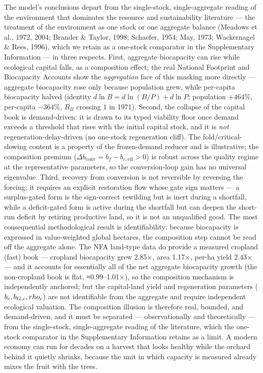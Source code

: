 \documentclass[11pt]{article}
\begin{document}
The model's conclusions depart from the single-stock, single-aggregate reading of the environment that dominates the resource and sustainability literature --- the treatment of the environment as one stock or one aggregate balance (Meadows et al., 1972, 2004; Brander \& Taylor, 1998; Schaefer, 1954; May, 1973; Wackernagel \& Rees, 1996), which we retain as a one-stock comparator in the Supplementary Information --- in three respects. First, aggregate biocapacity can rise while ecological capital falls, as a composition effect; the real National Footprint and Biocapacity Accounts show the \emph{aggregation} face of this masking more directly --- aggregate biocapacity rose only because population grew, while per-capita biocapacity halved (identity $d\ln B=d\ln(B/P)+d\ln P$; population $+464\%$, per-capita $-364\%$, $R_B$ crossing $1$ in 1971). Second, the collapse of the capital book is demand-driven: it is drawn to its typed viability floor once demand exceeds a threshold that rises with the initial capital stock, and it is \emph{not} regeneration-delay-driven (no one-stock regeneration cliff). The fold/critical-slowing content is a property of the frozen-demand reducer and is illustrative; the composition premium ($\Delta b_{\mathrm{conv}}=b_f-b_{c,\mathrm{eff}}>0$) is robust across the quality regime at the representative parameters, so the conversion-loop gain has no universal eigenvalue. Third, recovery from conversion is not reversible by reversing the forcing; it requires an explicit restoration flow whose gate sign matters --- a surplus-gated form is the sign-correct rewilding but is inert during a shortfall, while a deficit-gated form is active during the shortfall but can deepen the short-run deficit by retiring productive land, so it is not an unqualified good. The most consequential methodological result is identifiability: because biocapacity is expressed in value-weighted global hectares, the composition step cannot be read off the aggregate alone. The NFA land-type data do provide a measured cropland (fast) book --- cropland biocapacity grew 2.85×, area 1.17×, per-ha yield 2.43× --- and it accounts for essentially all of the net aggregate biocapacity growth (the non-cropland book is flat, ≈0.99--1.01×), so the composition mechanism is independently anchored; but the capital-land yield and regeneration parameters ($b_c,\\ b_{G,c},\\ \\rho_c$) are not identifiable from the aggregate and require independent ecological valuation. The composition illusion is therefore real, bounded, and demand-driven, and it must be separated --- observationally and theoretically --- from the single-stock, single-aggregate reading of the literature, which the one-stock comparator in the Supplementary Information retains as a limit. A modern economy can run for decades on a harvest that looks healthy while the orchard behind it quietly shrinks, because the unit in which capacity is measured already mixes the fruit with the trees.
\end{document}
